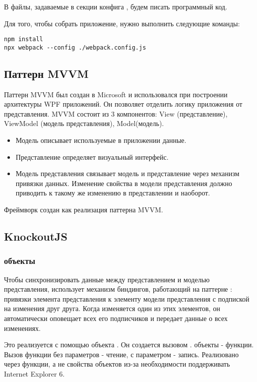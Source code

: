 \documentclass[a4paper,14pt]{extarticle}
\begin{document}
В файлы, задаваемые в секции  конфига , будем писать
программный код.

Для того, чтобы собрать приложение, нужно выполнить следующие команды:

\begin{lstlisting}
npm install
npx webpack --config ./webpack.config.js
\end{lstlisting}

\subsection{Паттерн MVVM}

Паттерн MVVM был создан в Microsoft и использовался при построении архитектуры
WPF приложений. Он позволяет отделить логику приложения от представления. MVVM
состоит из 3 компонентов: View (представление), ViewModel (модель
представления), Model(модель).

\begin{itemize}
    \item Модель описывает используемые в приложении данные.
    \item Представление определяет визуальный интерфейс.
    \item Модель представления связывает модель и представление через механизм
          привязки данных. Изменение свойства в модели представления должно
          приводить к такому же изменению в представлении и наоборот.
\end{itemize}

Фреймворк  создан как реализация паттерна MVVM.

\subsection{KnockoutJS}
\subsubsection{ объекты}

Чтобы синхронизировать данные между представлением и моделью представления,
 использует механизм биндингов, работающий на паттерне
: привязки элемента представления к элементу модели
представления с подпиской на изменения друг друга. Когда изменяется один из этих
элементов, он автоматически оповещает всех его подписчиков и передает данные о
всех изменениях.

Это реализуется с помощью объекта . Он создается вызовом
.  объекты - функции. Вызов функции без
параметров - чтение, с параметром - запись. Реализовано через функции, а не
свойства объектов из-за необходимости поддерживать Internet Explorer 6.
\end{document}
